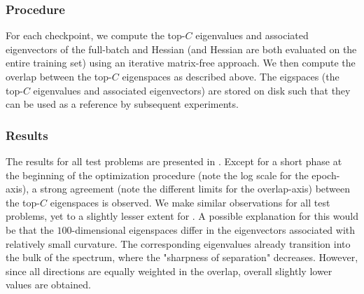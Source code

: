\subsubsection{Procedure}

For each checkpoint, we compute the top-$C$ eigenvalues and associated
eigenvectors of the full-batch \ggn and Hessian (\ie \ggn and Hessian are both
evaluated on the entire training set) using an iterative matrix-free approach.
We then compute the overlap between the top-$C$ eigenspaces as described above.
The eigspaces (\ie the top-$C$ eigenvalues and associated eigenvectors) are
stored on disk such that they can be used as a reference by subsequent
experiments.

\subsubsection{Results}

The results for all test problems are presented in
. Except for a short phase at the beginning of
the optimization procedure (note the log scale for the epoch-axis), a strong
agreement (note the different limits for the overlap-axis) between the top-$C$
eigenspaces is observed. We make similar observations for all test problems, yet
to a slightly lesser extent for \cifarhun{}. A possible explanation for this
would be that the $100$-dimensional eigenspaces differ in the eigenvectors
associated with relatively small curvature. The corresponding eigenvalues
already transition into the bulk of the spectrum, where the "sharpness of
separation" decreases. However, since all directions are equally weighted in the
overlap, overall slightly lower values are obtained.
%


